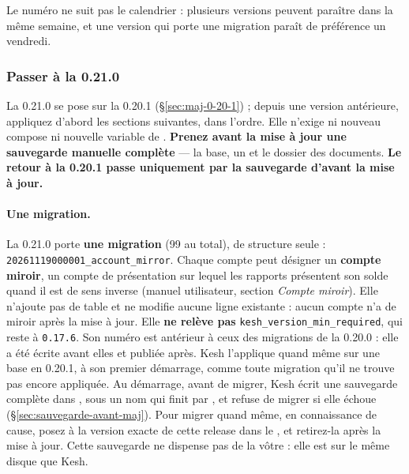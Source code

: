\documentclass[a4paper,11pt,oneside]{article}
\begin{document}
Le numéro ne suit pas le calendrier : plusieurs versions peuvent paraître dans la même semaine, et une version qui porte une migration paraît de préférence un vendredi.

\subsubsection{Passer à la 0.21.0}\label{sec:maj-0-21-0}
\sloppy

La 0.21.0 se pose sur la 0.20.1 (\S\ref{sec:maj-0-20-1}) ; depuis une version antérieure, appliquez d'abord les sections suivantes, dans l'ordre. Elle n'exige ni nouveau compose ni nouvelle variable de . \textbf{Prenez avant la mise à jour une sauvegarde manuelle complète} --- la base, un  et le dossier des documents. \textbf{Le retour à la 0.20.1 passe uniquement par la sauvegarde d'avant la mise à jour.}

\paragraph{Une migration.} La 0.21.0 porte \textbf{une migration} (99 au total), de structure seule : \texttt{20261119000001\_account\allowbreak\_mirror}. Chaque compte peut désigner un \textbf{compte miroir}, un compte de présentation sur lequel les rapports présentent son solde quand il est de sens inverse (manuel utilisateur, section \emph{Compte miroir}). Elle n'ajoute pas de table et ne modifie aucune ligne existante : aucun compte n'a de miroir après la mise à jour. Elle \textbf{ne relève pas} \texttt{kesh\_version\_min\_required}, qui reste à \texttt{0.17.6}. Son numéro est antérieur à ceux des migrations de la 0.20.0 : elle a été écrite avant elles et publiée après. Kesh l'applique quand même sur une base en 0.20.1, à son premier démarrage, comme toute migration qu'il ne trouve pas encore appliquée. Au démarrage, avant de migrer, Kesh écrit une sauvegarde complète dans , sous un nom qui finit par , et refuse de migrer si elle échoue (\S\ref{sec:sauvegarde-avant-maj}). Pour migrer quand même, en connaissance de cause, posez  à la version exacte de cette release dans le , et retirez-la après la mise à jour. Cette sauvegarde ne dispense pas de la vôtre : elle est sur le même disque que Kesh.
\end{document}
